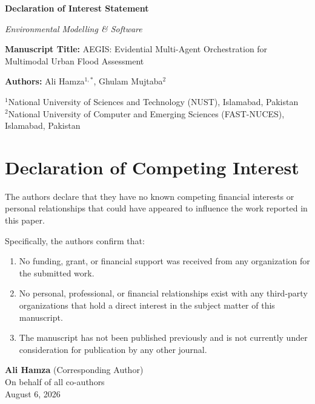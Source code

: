 \documentclass[11pt,a4paper]{article}
\begin{document}
\thispagestyle{empty}

\begin{center}
{\Large \bf Declaration of Interest Statement \par}
\vspace{0.5em}
{\large \textit{Environmental Modelling \& Software} \par}
\end{center}

\vspace{2em}

\noindent \textbf{Manuscript Title:} AEGIS: Evidential Multi-Agent Orchestration for Multimodal Urban Flood Assessment

\vspace{1.5em}

\noindent \textbf{Authors:} Ali Hamza$^{1,*}$, Ghulam Mujtaba$^2$

\vspace{1em}

\noindent $^1$National University of Sciences and Technology (NUST), Islamabad, Pakistan \\
$^2$National University of Computer and Emerging Sciences (FAST-NUCES), Islamabad, Pakistan

\vspace{2em}

\section*{Declaration of Competing Interest}

\noindent The authors declare that they have no known competing financial interests or personal relationships that could have appeared to influence the work reported in this paper.

\vspace{1.5em}

\noindent Specifically, the authors confirm that:
\begin{enumerate}
    \item No funding, grant, or financial support was received from any organization for the submitted work.
    \item No personal, professional, or financial relationships exist with any third-party organizations that hold a direct interest in the subject matter of this manuscript.
    \item The manuscript has not been published previously and is not currently under consideration for publication by any other journal.
\end{enumerate}

\vspace{3em}

\begin{flushleft}
\textbf{Ali Hamza} (Corresponding Author) \\
On behalf of all co-authors \\
August 6, 2026
\end{flushleft}
\end{document}
